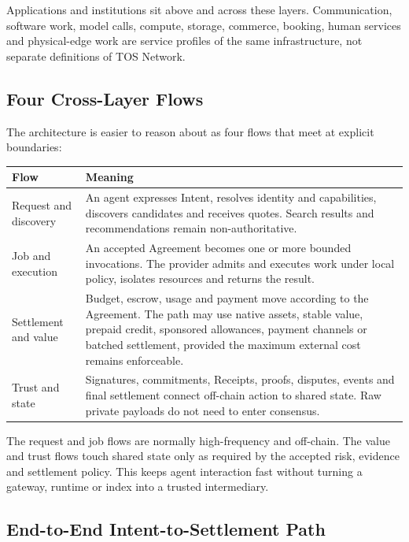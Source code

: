 \documentclass[11pt,oneside]{article}
\begin{document}
Applications and institutions sit above and across these layers. Communication, software
work, model calls, compute, storage, commerce, booking, human services and physical-edge work
are service profiles of the same infrastructure, not separate definitions of TOS Network.

\subsection{Four Cross-Layer Flows}

The architecture is easier to reason about as four flows that meet at explicit boundaries:

\begin{longtable}{L{0.20\textwidth}L{0.69\textwidth}}
\toprule
Flow & Meaning \\
\midrule
\endhead
Request and discovery &
An agent expresses Intent, resolves identity and capabilities, discovers candidates and
receives quotes. Search results and recommendations remain non-authoritative. \\
Job and execution &
An accepted Agreement becomes one or more bounded invocations. The provider admits and
executes work under local policy, isolates resources and returns the result. \\
Settlement and value &
Budget, escrow, usage and payment move according to the Agreement. The path may use native
assets, stable value, prepaid credit, sponsored allowances, payment channels or batched
settlement, provided the maximum external cost remains enforceable. \\
Trust and state &
Signatures, commitments, Receipts, proofs, disputes, events and final settlement connect
off-chain action to shared state. Raw private payloads do not need to enter consensus. \\
\bottomrule
\end{longtable}

The request and job flows are normally high-frequency and off-chain. The value and trust
flows touch shared state only as required by the accepted risk, evidence and settlement
policy. This keeps agent interaction fast without turning a gateway, runtime or index into a
trusted intermediary.

\subsection{End-to-End Intent-to-Settlement Path}
\end{document}
